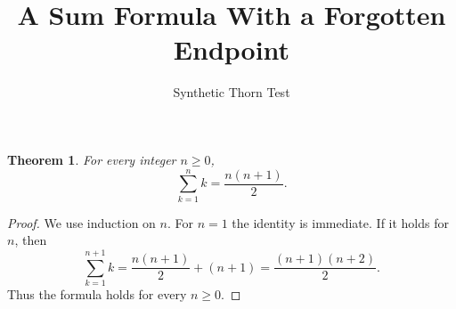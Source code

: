 \documentclass{article}
\newtheorem{theorem}{Theorem}
\begin{document}
\title{A Sum Formula With a Forgotten Endpoint}
\author{Synthetic Thorn Test}
\maketitle

\begin{theorem}\label{thm:missing-zero-case}
For every integer $n\ge 0$,
\[
\sum_{k=1}^{n} k=\frac{n(n+1)}{2}.
\]
\end{theorem}
\begin{proof}
We use induction on $n$. For $n=1$ the identity is immediate. If it holds for $n$, then
\[
\sum_{k=1}^{n+1} k=\frac{n(n+1)}{2}+(n+1)=\frac{(n+1)(n+2)}{2}.
\]
Thus the formula holds for every $n\ge 0$.
\end{proof}
\end{document}
